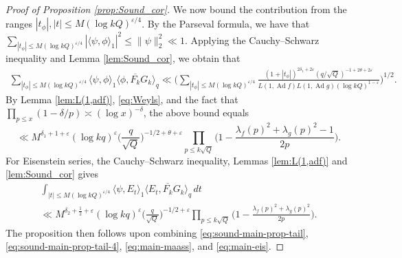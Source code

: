 \documentclass[12pt,reqno]{amsart}
\theoremstyle{remark}
\DeclareMathOperator{\ad}{Ad}
\numberwithin{equation}{section}
\begin{document}
\begin{proof}[Proof of Proposition \ref{prop:Sound_cor}]
    We now bound the contribution from the ranges $|t_\phi|, |t| \le M(\log kQ)^{\varepsilon/4}$. By the Parseval formula, we have that  $\sum_{|t_\phi| \le M(\log kQ)^{\varepsilon/4}} |\langle\psi,\phi\rangle_1|^2 \le \lVert \psi\rVert_2^2 \ll 1$.  Applying the Cauchy--Schwarz inequality and Lemma \ref{lem:Sound_cor}, we obtain that
		\begin{equation*}
            \label{eq:parsevel-2}
			\begin{aligned}
        \sum_{ |t_\phi|  \le M(\log kQ)^{\varepsilon/4}} \langle \psi, \phi \rangle_1 \langle \phi, \overline{F_k}G_k \rangle_q
        \ll \Big(\sum_{ |t_\phi|  \le M(\log kQ)^{\varepsilon/4}} \frac{ (1+|t_\phi|)^{2\delta_1+2\varepsilon}(q/\sqrt{Q})^{-1+2\theta+2\varepsilon}}{L(1, \ad f)L(1, \ad g)(\log kQ)^{1-\varepsilon}}\Big)^{1/2}.
	\end{aligned}
		\end{equation*}
        By Lemma \ref{lem:L(1,adf)}, \eqref{eq:Weyls}, and the fact that $\prod_{p\le x}(1-\delta/{p}) \asymp (\log x)^{-\delta}$, the above bound equals
        \begin{equation}\label{eq:main-maass}
        \ll M^{\delta_1+1+\varepsilon}(\log kq)^{\varepsilon}\Big(\frac{q}{\sqrt{Q}}\Big)^{-1/2+\theta+\varepsilon}\prod_{p \le k\sqrt{Q}}\Big(1-\frac{\lambda_f(p)^2+\lambda_g(p)^2-1}{2p}\Big).
        \end{equation}
	For Eisenstein series, the Cauchy--Schwarz inequality, Lemmas  \ref{lem:L(1,adf)} and \ref{lem:Sound_cor}  gives
		\begin{multline}\label{eq:main-eis}
				\int_{|t| \le M(\log kQ)^{\varepsilon/4}} \langle \psi, E_t \rangle_1 \langle E_t, \overline{F_k}G_k \rangle_q \, dt\\ 
                \ll M^{\delta_2+\frac{1}{2}+\varepsilon}(\log kq)^{\varepsilon}\Big(\frac{q}{\sqrt{Q}}\Big)^{-1/2+\varepsilon}\prod_{p \le k\sqrt{Q}}\Big(1-\frac{\lambda_f(p)^2+\lambda_g(p)^2}{2p}\Big).
		\end{multline}
	The proposition then follows upon combining \eqref{eq:sound-main-prop-tail}, \eqref{eq:sound-main-prop-tail-4}, \eqref{eq:main-maass}, and \eqref{eq:main-eis}.
	\end{proof}


\end{document}
